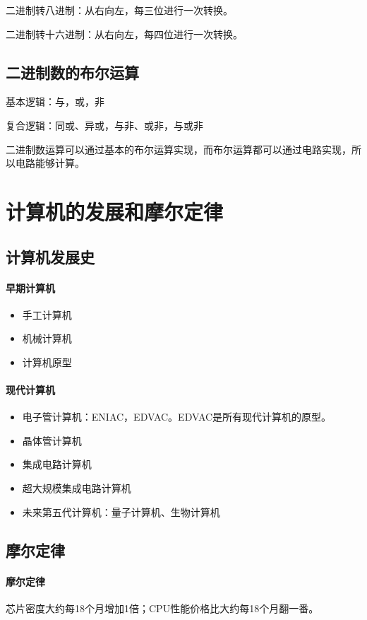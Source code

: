 \documentclass[UTF8]{ctexart}
\begin{document}
二进制转八进制：从右向左，每三位进行一次转换。

二进制转十六进制：从右向左，每四位进行一次转换。

\subsection{二进制数的布尔运算}
基本逻辑：与，或，非

复合逻辑：同或、异或，与非、或非，与或非

二进制数运算可以通过基本的布尔运算实现，而布尔运算都可以通过电路实现，所以电路能够计算。

\section{计算机的发展和摩尔定律}
\subsection{计算机发展史}
\paragraph{早期计算机}
\begin{itemize}
    \item 手工计算机
    \item 机械计算机
    \item 计算机原型
\end{itemize}

\paragraph{现代计算机}
\begin{itemize}
    \item 电子管计算机：ENIAC，EDVAC。EDVAC是所有现代计算机的原型。
    \item 晶体管计算机
    \item 集成电路计算机
    \item 超大规模集成电路计算机
    \item 未来第五代计算机：量子计算机、生物计算机
\end{itemize}

\subsection{摩尔定律}
\paragraph{摩尔定律}
芯片密度大约每18个月增加1倍；CPU性能价格比大约每18个月翻一番。
\end{document}
